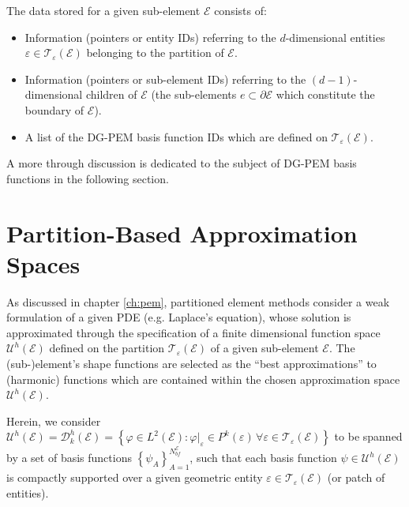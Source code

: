 	The data stored for a given sub-element $\mathcal{E}$ consists of:
	\begin{itemize}
		\item Information (pointers or entity IDs) referring to the $d$-dimensional entities $\varepsilon \in \mathcal{T}_\varepsilon (\mathcal{E})$ belonging to the partition of $\mathcal{E}$.
		\item Information (pointers or sub-element IDs) referring to the $(d-1)$-dimensional children of $\mathcal{E}$ (the sub-elements $e \subset \partial \mathcal{E}$ which constitute the boundary of $\mathcal{E}$).
		\item A list of the DG-PEM basis function IDs which are defined on $\mathcal{T}_\varepsilon (\mathcal{E})$.
	\end{itemize}
	
	A more through discussion is dedicated to the subject of DG-PEM basis functions in the following section.
	
\section{Partition-Based Approximation Spaces}

		As discussed in chapter \ref{ch:pem}, partitioned element methods consider a weak formulation of a given PDE (e.g. Laplace's equation), whose solution is approximated through the specification of a finite dimensional function space $\mathcal{U}^h (\mathcal{E})$ defined on the partition $\mathcal{T}_{\varepsilon} (\mathcal{E})$ of a given sub-element $\mathcal{E}$. The (sub-)element's shape functions are selected as the ``best approximations'' to (harmonic) functions which are contained within the chosen approximation space $\mathcal{U}^h (\mathcal{E})$.
		
		Herein, we consider $\mathcal{U}^h (\mathcal{E}) = \mathcal{D}^h_k (\mathcal{E}) = \left\{ \varphi \in L^2 (\mathcal{E}) : \varphi|_{\varepsilon} \in P^k (\varepsilon) \, \forall \varepsilon \in \mathcal{T}_\varepsilon (\mathcal{E}) \right\}$ to be spanned by a set of basis functions $\left\{ \psi_A \right\}_{A=1}^{N^{\mathcal{E}}_{bf}}$, such that each basis function $\psi \in \mathcal{U}^h (\mathcal{E})$ is compactly supported over a given geometric entity $\varepsilon \in \mathcal{T}_\varepsilon (\mathcal{E})$ (or patch of entities).
		

